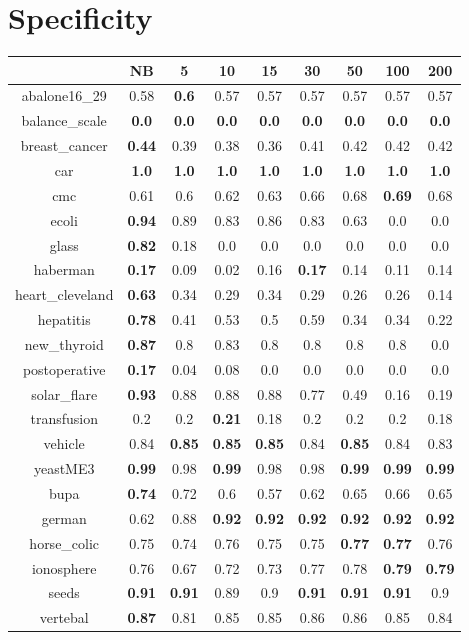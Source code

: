 \documentclass{article}%
\begin{document}
%
\section*{Specificity}%
\begin{tabular}{c|cccccccc}%
\hline%
&NB&5&10&15&30&50&100&200\\%
\hline%
abalone16\_29&0.58&\textbf{0.6}&0.57&0.57&0.57&0.57&0.57&0.57\\%
\hline%
balance\_scale&\textbf{0.0}&\textbf{0.0}&\textbf{0.0}&\textbf{0.0}&\textbf{0.0}&\textbf{0.0}&\textbf{0.0}&\textbf{0.0}\\%
\hline%
breast\_cancer&\textbf{0.44}&0.39&0.38&0.36&0.41&0.42&0.42&0.42\\%
\hline%
car&\textbf{1.0}&\textbf{1.0}&\textbf{1.0}&\textbf{1.0}&\textbf{1.0}&\textbf{1.0}&\textbf{1.0}&\textbf{1.0}\\%
\hline%
cmc&0.61&0.6&0.62&0.63&0.66&0.68&\textbf{0.69}&0.68\\%
\hline%
ecoli&\textbf{0.94}&0.89&0.83&0.86&0.83&0.63&0.0&0.0\\%
\hline%
glass&\textbf{0.82}&0.18&0.0&0.0&0.0&0.0&0.0&0.0\\%
\hline%
haberman&\textbf{0.17}&0.09&0.02&0.16&\textbf{0.17}&0.14&0.11&0.14\\%
\hline%
heart\_cleveland&\textbf{0.63}&0.34&0.29&0.34&0.29&0.26&0.26&0.14\\%
\hline%
hepatitis&\textbf{0.78}&0.41&0.53&0.5&0.59&0.34&0.34&0.22\\%
\hline%
new\_thyroid&\textbf{0.87}&0.8&0.83&0.8&0.8&0.8&0.8&0.0\\%
\hline%
postoperative&\textbf{0.17}&0.04&0.08&0.0&0.0&0.0&0.0&0.0\\%
\hline%
solar\_flare&\textbf{0.93}&0.88&0.88&0.88&0.77&0.49&0.16&0.19\\%
\hline%
transfusion&0.2&0.2&\textbf{0.21}&0.18&0.2&0.2&0.2&0.18\\%
\hline%
vehicle&0.84&\textbf{0.85}&\textbf{0.85}&\textbf{0.85}&0.84&\textbf{0.85}&0.84&0.83\\%
\hline%
yeastME3&\textbf{0.99}&0.98&\textbf{0.99}&0.98&0.98&\textbf{0.99}&\textbf{0.99}&\textbf{0.99}\\%
\hline%
bupa&\textbf{0.74}&0.72&0.6&0.57&0.62&0.65&0.66&0.65\\%
\hline%
german&0.62&0.88&\textbf{0.92}&\textbf{0.92}&\textbf{0.92}&\textbf{0.92}&\textbf{0.92}&\textbf{0.92}\\%
\hline%
horse\_colic&0.75&0.74&0.76&0.75&0.75&\textbf{0.77}&\textbf{0.77}&0.76\\%
\hline%
ionosphere&0.76&0.67&0.72&0.73&0.77&0.78&\textbf{0.79}&\textbf{0.79}\\%
\hline%
seeds&\textbf{0.91}&\textbf{0.91}&0.89&0.9&\textbf{0.91}&\textbf{0.91}&\textbf{0.91}&0.9\\%
\hline%
vertebal&\textbf{0.87}&0.81&0.85&0.85&0.86&0.86&0.85&0.84\\%
\hline%
\end{tabular}
\end{document}
